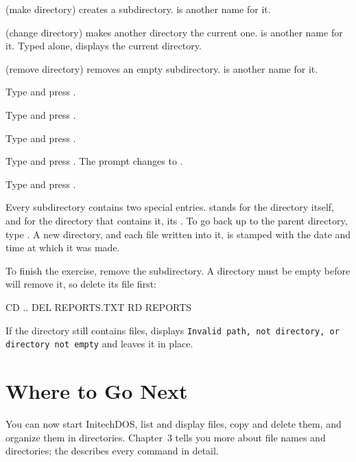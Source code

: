  (make directory) creates a subdirectory.
 is another name for it.

 (change directory) makes another directory the current
one.   is another name for it.  Typed alone,  displays
the current directory.

 (remove directory) removes an empty subdirectory.
 is another name for it.

\begin{Steps}
\item Type  and press .
\item Type  and press .
\item Type  and press .
\item Type  and press .  The prompt changes to
  .
\item Type  and press .
\end{Steps}


Every subdirectory contains two special entries.   stands for the
directory itself, and  for the directory that contains it, its
.  To go back up to the parent directory, type .
A new directory, and each file written into it, is stamped with the date
and time at which it was made.

To finish the exercise, remove the subdirectory.  A directory must be empty
before  will remove it, so delete its file first:
\begin{TypeIn}
CD ..
DEL REPORTS\MEMO.TXT
RD REPORTS
\end{TypeIn}
If the directory still contains files,  displays \texttt{Invalid
path, not directory, or directory not empty} and leaves it in place.

\section{Where to Go Next}
You can now start InitechDOS, list and display files, copy and delete
them, and organize them in directories.  Chapter~3 tells you more about
file names and directories; the  describes
every command in detail.
